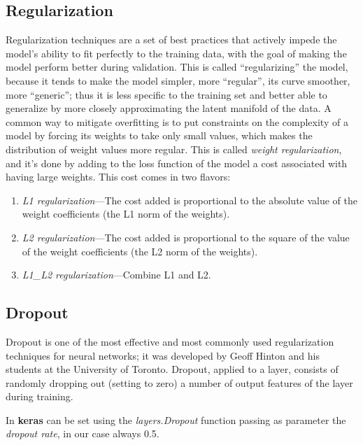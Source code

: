\subsection{Regularization}
Regularization techniques are a set of best practices that actively impede the model’s ability to fit perfectly to the training data, with the goal of making the model perform better during validation. This is called “regularizing” the model, because it tends to make the model simpler, more “regular”, its curve smoother, more “generic”; thus it is less specific to the training set and better able to generalize by more closely approximating the latent manifold of the data.
A common way to mitigate overfitting is to put constraints on the complexity of a model by forcing its weights to take only small values, which makes the distribution of weight values more regular. This is called \textit{weight regularization}, and it’s done by adding to the loss function of the model a cost associated with having large weights. This cost comes in two flavors:
\begin{enumerate}
\item \textit{L1 regularization}—The cost added is proportional to the absolute value of the weight coefficients (the L1 norm of the weights).
\item \textit{L2 regularization}—The cost added is proportional to the square of the value of the weight coefficients (the L2 norm of the weights).
\item \textit{L1\_L2 regularization}—Combine L1 and L2.
\end{enumerate}

\subsection{Dropout}
Dropout is one of the most effective and most commonly used regularization techniques for neural networks; it was developed by Geoff Hinton and his students at the University of Toronto. Dropout, applied to a layer, consists of randomly dropping out (setting to zero) a number of output features of the layer during training.

In \textbf{keras} can be set using the \textit{layers.Dropout} function passing as parameter the \textit{dropout rate}, in our case always 0.5.

